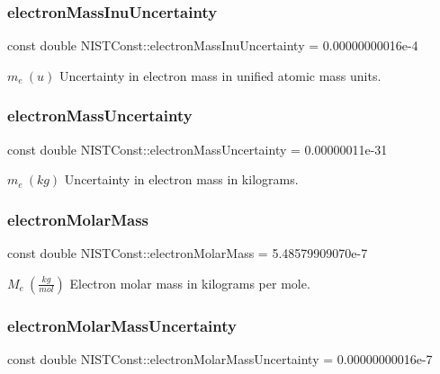 \subsubsection{\texorpdfstring{electron\+Mass\+Inu\+Uncertainty}{electronMassInuUncertainty}}
{\footnotesize\ttfamily const double N\+I\+S\+T\+Const\+::electron\+Mass\+Inu\+Uncertainty = 0.\+00000000016e-\/4}

$m_e \ (u)$ Uncertainty in electron mass in unified atomic mass units. \mbox{\label{group___n_i_s_t_const-_electron_ga558edc70a085ccbed99ad3e485b8abda}} 
\subsubsection{\texorpdfstring{electron\+Mass\+Uncertainty}{electronMassUncertainty}}
{\footnotesize\ttfamily const double N\+I\+S\+T\+Const\+::electron\+Mass\+Uncertainty = 0.\+00000011e-\/31}

$m_e \ (kg)$ Uncertainty in electron mass in kilograms. \mbox{\label{group___n_i_s_t_const-_electron_gaebecd54c70326d72d25d790c0ab62145}} 
\subsubsection{\texorpdfstring{electron\+Molar\+Mass}{electronMolarMass}}
{\footnotesize\ttfamily const double N\+I\+S\+T\+Const\+::electron\+Molar\+Mass = 5.\+48579909070e-\/7}

$M_e \ (\frac{kg}{mol})$ Electron molar mass in kilograms per mole. \mbox{\label{group___n_i_s_t_const-_electron_gadea683a9751b639f6d3375df24458b23}} 
\subsubsection{\texorpdfstring{electron\+Molar\+Mass\+Uncertainty}{electronMolarMassUncertainty}}
{\footnotesize\ttfamily const double N\+I\+S\+T\+Const\+::electron\+Molar\+Mass\+Uncertainty = 0.\+00000000016e-\/7}


